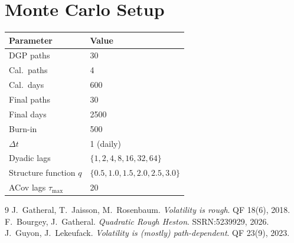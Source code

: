 \documentclass[11pt,a4paper]{article}
\begin{document}
\section{Monte Carlo Setup}
\begin{center}\renewcommand{\arraystretch}{1.4}
\begin{tabular}{ll}\toprule Parameter & Value \\\midrule
DGP paths & 30 \\ Cal.\ paths & 4 \\ Cal.\ days & 600 \\
Final paths & 30 \\ Final days & 2500 \\ Burn-in & 500 \\
$\Delta t$ & 1 (daily) \\ Dyadic lags & $\{1,2,4,8,16,32,64\}$ \\
Structure function $q$ & $\{0.5,1.0,1.5,2.0,2.5,3.0\}$ \\
ACov lags $\tau_{\max}$ & 20 \\
\bottomrule\end{tabular}\end{center}
\begin{thebibliography}{9}
 J.\ Gatheral, T.\ Jaisson, M.\ Rosenbaum.
\textit{Volatility is rough}. QF 18(6), 2018.
 F.\ Bourgey, J.\ Gatheral.
\textit{Quadratic Rough Heston}. SSRN:5239929, 2026.
 J.\ Guyon, J.\ Lekeufack.
\textit{Volatility is (mostly) path-dependent}. QF 23(9), 2023.
\end{thebibliography}
\end{document}

